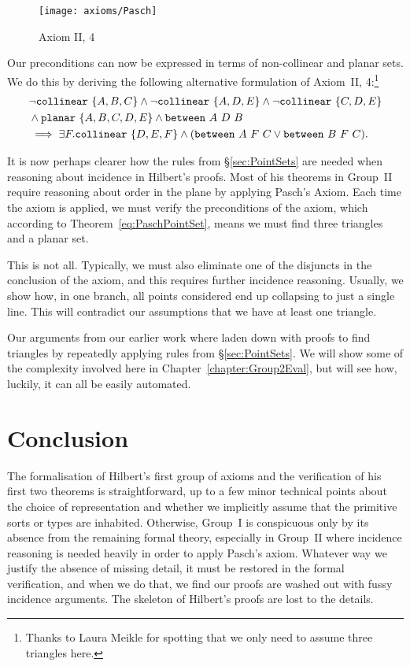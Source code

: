 \begin{figure}
\centering\texttt{[image: axioms/Pasch]}
\caption{Axiom II, 4}
\label{fig:PaschDiagram}
\end{figure}

Our preconditions can now be expressed in terms of non-collinear and planar sets. We do this by deriving the following alternative formulation of Axiom~II, 4:\footnote{Thanks to Laura Meikle for spotting that we only need to assume three triangles here.}
\begin{align}\label{eq:PaschPointSet}
  &\neg\code{collinear}\ \{A,B,C\}\wedge\neg\code{collinear}\ \{A,D,E\}\wedge\neg\code{collinear}\ \{C,D,E\}\\
  &\wedge\code{planar}\ \{A,B,C,D,E\}\wedge\between{A}{D}{B}\\
  &\implies\exists F. \code{collinear}\ \{D,E,F\} \wedge (\between{A}{F}{C}\vee\between{B}{F}{C}).
\end{align} 

It is now perhaps clearer how the rules from \S\ref{sec:PointSets} are needed when reasoning about incidence in Hilbert's proofs. Most of his theorems in Group~II require reasoning about order in the plane by applying Pasch's Axiom. Each time the axiom is applied, we must verify the preconditions of the axiom, which according to Theorem~\ref{eq:PaschPointSet}, means we must find three triangles and a planar set. 

This is not all. Typically, we must also eliminate one of the disjuncts in the conclusion of the axiom, and this requires further incidence reasoning. Usually, we show how, in one branch, all points considered end up collapsing to just a single line. This will contradict our assumptions that we have at least one triangle.

Our arguments from our earlier work where laden down with proofs to find triangles by repeatedly applying rules from \S\ref{sec:PointSets}. We will show some of the complexity involved here in Chapter~\ref{chapter:Group2Eval}, but will see how, luckily, it can all be easily automated.

\section{Conclusion}
The formalisation of Hilbert's first group of axioms and the verification of his first two theorems is straightforward, up to a few minor technical points about the choice of representation and whether we implicitly assume that the primitive sorts or types are inhabited. Otherwise, Group~I is conspicuous only by its absence from the remaining formal theory, especially in Group~II where incidence reasoning is needed heavily in order to apply Pasch's axiom. Whatever way we justify the absence of missing detail, it must be restored in the formal verification, and when we do that, we find our proofs are washed out with fussy incidence arguments. The skeleton of Hilbert's proofs are lost to the details. 

